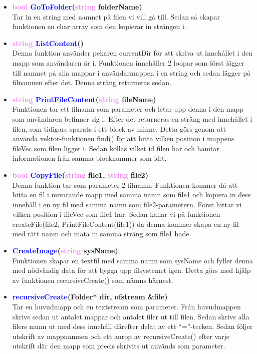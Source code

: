 \documentclass[a4paper,11pt]{article}
\newcommand{\colorFunction}[1]{\textcolor{blue}{#1}}
\newcommand{\colorType}[1]{\textcolor{violet}{#1}}
\begin{document}
\begin{itemize}
\item \textbf{\colorType{bool} \colorFunction{GoToFolder}(\colorType{string} folderName)} \\
Tar in en string med namnet på filen vi vill gå till. Sedan så skapar funktionen en char array som den kopierar in strängen i.

\item \textbf{\colorType{string} \colorFunction{ListContent}()} \\
Denna funktion använder pekaren currentDir för att skriva ut innehållet i den mapp som användaren är i. Funktionen innehåller 2 loopar som först lägger till namnet på alla mappar i användarmappen i en string och sedan lägger på filnamnen efter det. Denna sträng returneras sedan.

\item \textbf{\colorType{string} \colorFunction{PrintFileContent}(\colorType{string} fileName)} \\
Funktionen tar ett filnamn som parameter och letar upp denna i den mapp som användaren befinner sig i. Efter det returneras en sträng med innehållet i filen, som tidigare sparats i ett block av minne. Detta görs genom att använda vektor-funktionen find() för att hitta vilken position i mappens fileVec som filen ligger i. Sedan kollas vilket id filen har och hämtar informationen från samma blocknummer som id:t.

\item \textbf{\colorType{bool} \colorFunction{CopyFile}(\colorType{string} file1, \colorType{string} file2)} \\
Denna funktion tar som parameter 2 filnamn. Funktionen kommer då att hitta en fil i nuvarande mapp med samma namn som file1 och kopiera in dess innehåll i en ny fil med samma namn som file2-parametern. Först hittar vi vilken position i fileVec som file1 har. Sedan kallar vi på funktionen createFile(file2, PrintFileContent(file1)) då denna kommer skapa en ny fil med rätt namn och mata in samma sträng som file1 hade.

\item \textbf{\colorFunction{CreateImage}(\colorType{string} sysName)} \\
Funktionen skapar en textfil med samma namn som sysName och fyller denna med nödvändig data för att bygga upp filsystemet igen. Detta görs med hjälp av funktionen recursiveCreate() som nämns härnest.

\item \textbf{\colorFunction{recursiveCreate}(Folder* dir, ofstream \&file)} \\
Tar en huvudmapp och en textstream som parameter. Från huvudmappen skrivs sedan ut antalet mappar och antalet filer ut till filen. Sedan skrivs alla filers namn ut med dess innehåll därefter delat av ett “=”-tecken. Sedan följer utskrift av mappnamnen och ett anrop av recursiveCreate() efter varje utskrift där den mapp som precis skrivits ut används som parameter.


\end{itemize}
\end{document}
